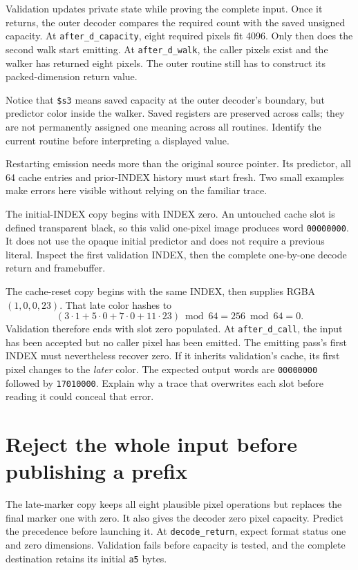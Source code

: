 Validation updates private state while proving the complete input. Once it
returns, the outer decoder compares the required count with the saved unsigned
capacity. At \texttt{after\_d\_capacity}, eight required pixels fit 4096.
Only then does the second walk start emitting. At \texttt{after\_d\_walk},
the caller pixels exist and the walker has returned eight pixels. The outer
routine still has to construct its packed-dimension return value.

Notice that \texttt{\$s3} means saved capacity at the outer decoder's boundary,
but predictor color inside the walker. Saved registers are preserved across
calls; they are not permanently assigned one meaning across all routines.
Identify the current routine before interpreting a displayed value.

Restarting emission needs more than the original source pointer. Its predictor,
all 64 cache entries and prior-INDEX history must start fresh. Two small examples
make errors here visible without relying on the familiar trace.

The initial-INDEX copy begins with INDEX zero. An untouched cache slot is defined
transparent black, so this valid one-pixel image produces word
\texttt{00000000}. It does not use the opaque initial predictor and does not
require a previous literal. Inspect the first validation INDEX, then the complete
one-by-one decode return and framebuffer.

The cache-reset copy begins with the same INDEX, then supplies RGBA $(1,0,0,23)$.
That late color hashes to
\[
  (3\cdot1+5\cdot0+7\cdot0+11\cdot23)\bmod64
  =256\bmod64=0.
\]
Validation therefore ends with slot zero populated. At \texttt{after\_d\_call},
the input has been accepted but no caller pixel has been emitted. The emitting
pass's first INDEX must nevertheless recover zero. If it inherits validation's
cache, its first pixel changes to the \emph{later} color. The expected output
words are \texttt{00000000} followed by \texttt{17010000}. Explain why a trace
that overwrites each slot before reading it could conceal that error.

\section{Reject the whole input before publishing a prefix}

The late-marker copy keeps all eight plausible pixel operations but replaces
the final marker one with zero. It also gives the decoder zero pixel capacity.
Predict the precedence before launching it. At \texttt{decode\_return}, expect
format status one and zero dimensions. Validation fails before capacity is tested,
and the complete destination retains its initial \texttt{a5} bytes.

